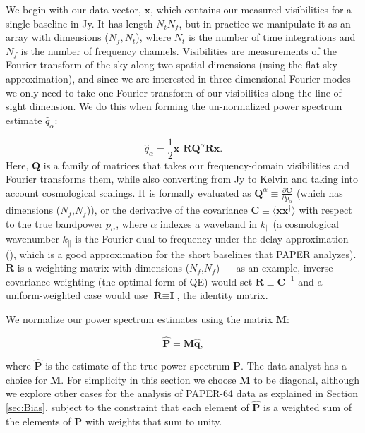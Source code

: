\documentclass[preprint2,numberedappendix,tighten]{aastex6}
\begin{document}
We begin with our data vector, $\textbf{x}$, which contains our measured visibilities for a single baseline in Jy. It has length $N_{t}N_{f}$, but in practice we manipulate it as an array with dimensions ($N_{f}, N_{t}$), where 
$N_{t}$ is the number of time integrations and $N_{f}$ is the number of frequency channels. Visibilities are measurements of 
the Fourier transform of the sky along two spatial dimensions (using the flat-sky approximation), and since we are interested in three-dimensional Fourier modes 
we only need to take one Fourier transform of our visibilities along the line-of-sight dimension. We do this when forming the un-normalized power spectrum estimate $\widehat{q}_{\alpha}$:

\begin{equation}
\label{eq:qhat}
\widehat{q}_{\alpha} = \frac{1}{2}\textbf{x}^{\dagger}\textbf{R}\textbf{Q}^{\alpha}\textbf{R}\textbf{x}.
\end{equation}
Here, \noindent $\textbf{Q}$ is a family of matrices that takes our frequency-domain visibilities and Fourier transforms them, while also converting from Jy to 
Kelvin and taking into account cosmological scalings. It is formally evaluated as $\textbf{Q}^{\alpha} \equiv \frac{\partial\textbf{C}}{\partial p_{\alpha}}$ (which has dimensions ($N_{f}$,$N_{f}$)), or the derivative of the covariance $\textbf{C} \equiv \langle\textbf{x}\textbf{x}^{\dagger}\rangle$ with respect to the true bandpower $p_\alpha$, where $\alpha$ indexes a waveband in $k_{\parallel}$ (a cosmological wavenumber $k_{\parallel}$ is the 
Fourier dual to frequency under the delay approximation (\citealt{parsons_et_al2012b}), which is a good approximation for the short baselines that PAPER analyzes). $\textbf{R}$ is a weighting matrix with dimensions ($N_{f}$,$N_{f}$) --- as 
an example, inverse covariance weighting (the optimal form of QE) would set $\textbf{R} \equiv \textbf{C}^{-1}$ and a uniform-weighted case would use $
\textbf{R} \equiv \textbf{I}$, the identity matrix.

We normalize our power spectrum estimates using the matrix $\textbf{M}$:

\begin{equation}
\label{eq:phat}
\widehat{\textbf{P}} = \textbf{M}\widehat{\textbf{q}},
\end{equation}

\noindent where $\widehat{\textbf{P}}$ is the estimate of the true power spectrum $\textbf{P}$. The data analyst has a choice for $
\textbf{M}$. For simplicity in this section we choose $\textbf{M}$ to be diagonal, although we explore other cases for the analysis 
of PAPER-64 data as explained in Section \ref{sec:Bias}, subject to the constraint that each element of $\widehat{\textbf{P}}$ is a weighted sum of the elements of $\textbf{P}$ with weights that sum to unity.
\end{document}
